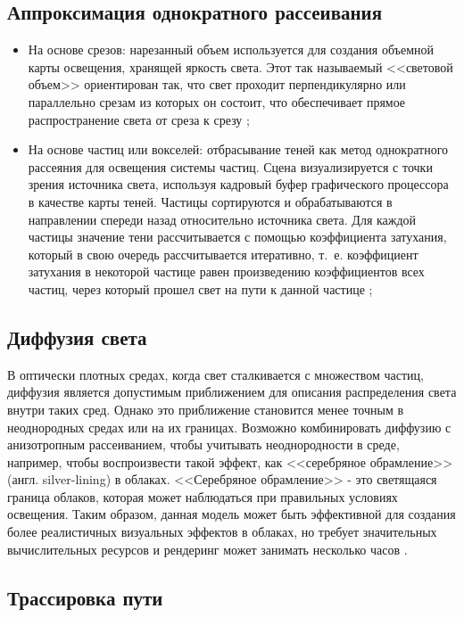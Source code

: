 \subsection{Аппроксимация однократного рассеивания}
\begin{itemize}
	\item На основе срезов: нарезанный объем используется для создания объемной карты освещения, хранящей яркость света. Этот так называемый <<световой объем>> ориентирован так, что свет проходит перпендикулярно или параллельно срезам из которых он состоит, что обеспечивает прямое распространение света от среза к срезу \cite{schpok};
	\item На основе частиц или вокселей: отбрасывание теней как метод однократного рассеяния для освещения системы частиц. Сцена визуализируется с точки зрения источника света, используя кадровый буфер графического процессора в качестве карты теней. Частицы сортируются и обрабатываются в направлении спереди назад относительно источника света. Для каждой частицы значение тени рассчитывается с помощью коэффициента затухания, который в свою очередь рассчитывается итеративно, т.~е. коэффициент затухания в некоторой частице равен произведению коэффициентов всех частиц, через который прошел свет на пути к данной частице \cite{voxel};
\end{itemize}

\subsection{Диффузия света}

 В оптически плотных средах, когда свет сталкивается с множеством частиц, диффузия является допустимым приближением для описания распределения света внутри таких сред. Однако это приближение становится менее точным в неоднородных средах или на их границах. 
 Возможно комбинировать диффузию с анизотропным рассеиванием, чтобы учитывать неоднородности в среде, например, чтобы воспроизвести такой эффект, как <<серебряное обрамление>> (англ. silver-lining) в облаках. <<Серебряное обрамление>> - это светящаяся граница облаков, которая может наблюдаться при правильных условиях освещения.
 Таким образом, данная модель может быть эффективной для создания более реалистичных визуальных эффектов в облаках, но требует значительных вычислительных ресурсов и рендеринг может занимать несколько часов \cite{clouds}.


\subsection{Трассировка пути}

